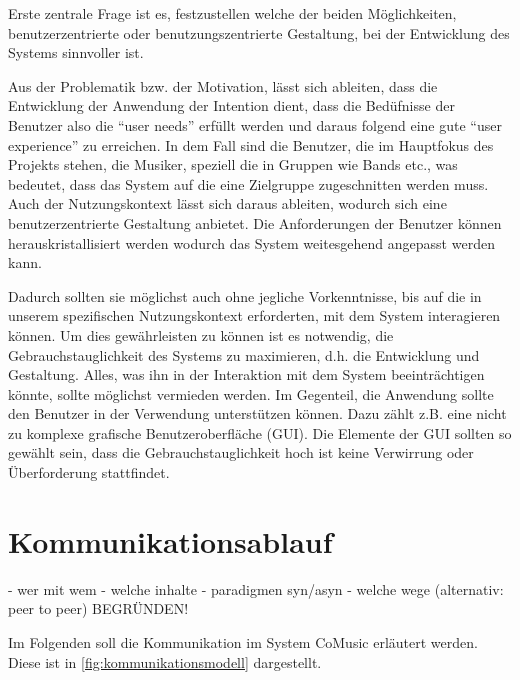 \documentclass[12pt]{scrartcl}
\begin{document}
Erste zentrale Frage ist es, festzustellen welche der beiden Möglichkeiten, benutzerzentrierte oder benutzungszentrierte Gestaltung, bei der Entwicklung des Systems sinnvoller ist.

Aus der Problematik bzw. der Motivation, lässt sich ableiten, dass die Entwicklung der Anwendung der Intention dient, dass die Bedüfnisse der Benutzer also die “user needs” erfüllt werden und daraus folgend eine gute “user experience” zu erreichen. 
In dem Fall sind die Benutzer, die im Hauptfokus des Projekts stehen, die Musiker, speziell die in Gruppen wie Bands etc., was bedeutet, dass das System auf die eine Zielgruppe zugeschnitten werden muss. Auch der Nutzungskontext lässt sich daraus ableiten, wodurch sich eine benutzerzentrierte Gestaltung anbietet. Die Anforderungen der Benutzer können herauskristallisiert werden wodurch das System weitesgehend angepasst werden kann.

Dadurch sollten sie möglichst auch ohne jegliche Vorkenntnisse, bis auf die in unserem spezifischen Nutzungskontext erforderten, mit dem System interagieren können.
Um dies gewährleisten zu können ist es notwendig, die Gebrauchstauglichkeit des Systems zu maximieren, d.h. die Entwicklung und Gestaltung. Alles, was ihn in der Interaktion mit dem System beeinträchtigen könnte, sollte möglichst vermieden werden. Im Gegenteil, die Anwendung sollte den Benutzer in der Verwendung unterstützen können. Dazu zählt z.B. eine nicht zu komplexe grafische Benutzeroberfläche (GUI). Die Elemente der GUI sollten so gewählt sein, dass die Gebrauchstauglichkeit hoch ist keine Verwirrung oder Überforderung stattfindet.



\section{Kommunikationsablauf}


- wer mit wem
- welche inhalte
- paradigmen syn/asyn
- welche wege (alternativ: peer to peer)
BEGRÜNDEN!

Im Folgenden soll die Kommunikation im System CoMusic erläutert werden. Diese ist in \ref{fig:kommunikationsmodell} dargestellt.
\end{document}
